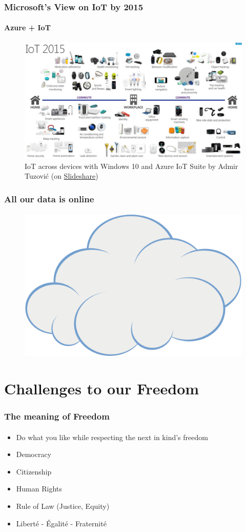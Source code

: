 \documentclass{beamer}
\begin{document}
	\begin{frame}
	\frametitle{Microsoft's View on IoT by 2015}
	\framesubtitle{Azure + IoT}
	        \begin{figure}[h]
                \centering
                \includegraphics[width=.8\textwidth]{./images/msft-IoT2015}
		\caption{IoT across devices with Windows 10 and Azure IoT Suite by Admir Tuzović (on \href{http://www.slideshare.net/BosniaAgile/iot-across-devices-with-windows-10-and-azure-iot-suite-by-admir-tuzovi}{Slideshare})}
        	\end{figure}
	\end{frame}

	\begin{frame}
	\frametitle{All our data is online}
	\framesubtitle{}
	        \begin{figure}[h]
                \centering
                \includegraphics[width=.8\textwidth]{./images/Cartoon_cloud.png}
        	\end{figure}
	\end{frame}


\section[Section]{Challenges to our Freedom}
	\begin{frame}
	\frametitle{The meaning of Freedom}
	\framesubtitle{}
		\begin{itemize}[<+->]
			\item Do what you like while respecting the next in kind's freedom
			\item Democracy
			\item Citizenship
			\item Human Rights
			\item Rule of Law (Justice, Equity)
			\item Liberté - Égalité - Fraternité
		\end{itemize}
	\end{frame}
\end{document}
